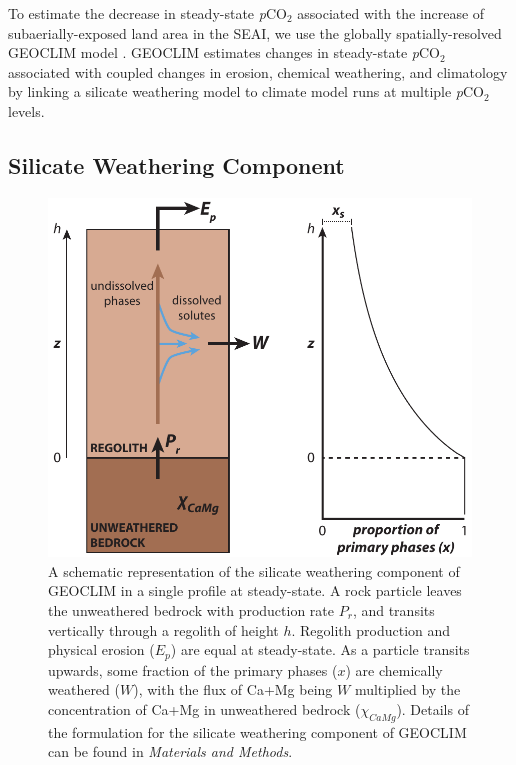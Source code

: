 \documentclass[9pt,twocolumn,twoside,lineno]{pnas-new}
\newcommand{\pCOtwo}{\textit{p}CO$_{2}$\xspace}
\newcommand{\MM}{\textit{Materials and Methods}\xspace}
\begin{document}
To estimate the decrease in steady-state \pCOtwo associated with the increase of subaerially-exposed land area in the SEAI, we use the globally spatially-resolved GEOCLIM model \cite{Godderis2017c}. GEOCLIM estimates changes in steady-state \pCOtwo associated with coupled changes in erosion, chemical weathering, and climatology by linking a silicate weathering model to climate model runs at multiple \pCOtwo levels.

\subsection*{Silicate Weathering Component}

\begin{figure}[h]
    \centering
    \includegraphics[width=1\linewidth]{Figures/regolith_schematic.pdf}
    \caption{A schematic representation of the silicate weathering component of GEOCLIM in a single profile at steady-state. A rock particle leaves the unweathered bedrock with production rate $P_{r}$, and transits vertically through a regolith of height $h$. Regolith production and physical erosion ($E_{p}$) are equal at steady-state. As a particle transits upwards, some fraction of the primary phases ($x$) are chemically weathered ($W$), with the flux of Ca+Mg being $W$ multiplied by the concentration of Ca+Mg in unweathered bedrock ($\chi_{CaMg}$). Details of the formulation for the silicate weathering component of GEOCLIM can be found in \MM.}
    \label{fig:regolith_schematic}
\end{figure}
\end{document}
